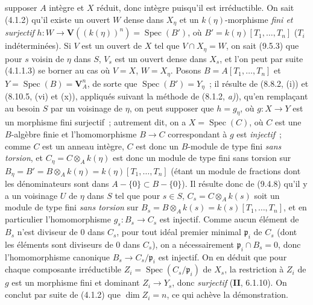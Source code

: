 
supposer $A$ intègre et $X$ réduit, donc intègre puisqu'il est irréductible. On
sait (4.1.2) qu'il existe un ouvert $W$ dense dans $X_\eta$ et un
$k(\eta)$-morphisme \emph{fini et surjectif}
$h:W\to\mathbf V((k(\eta))^n)=\operatorname{Spec}(B')$, où
$B'=k(\eta)[T_1,\ldots,T_n]$ ($T_i$ indéterminées). Si $V$ est un ouvert de
$X$ tel que $V\cap X_\eta=W$, on sait (9.5.3) que pour $s$ voisin de $\eta$
dans $S$, $V_s$ est un ouvert dense dans $X_s$, et l'on peut par suite (4.1.1.3)
se borner au cas où $V=X$, $W=X_\eta$. Posons
$B=A[T_1,\ldots,T_n]$ et $Y=\operatorname{Spec}(B)=\mathbf V_A^n$, de sorte
que $\operatorname{Spec}(B')=Y_\eta$~; il résulte de (8.8.2, (i)) et
(8.10.5, (vi) et (x)), appliqués suivant la méthode de (8.1.2, \emph{a)}),
qu'en remplaçant au besoin $S$ par un voisinage de $\eta$, on peut supposer que
$h=g_\eta$, où $g:X\to Y$ est un morphisme fini surjectif~; autrement dit, on
a $X=\operatorname{Spec}(C)$, où $C$ est une $B$-algèbre finie et
l'homomorphisme $B\to C$ correspondant à $g$ est \emph{injectif}~; comme $C$
est un anneau intègre, $C$ est donc un $B$-module de type fini \emph{sans
torsion}, et $C_\eta=C\otimes_A k(\eta)$ est donc un module de type fini sans
torsion sur $B_\eta=B'=B\otimes_A k(\eta)=k(\eta)[T_1,\ldots,T_n]$ (étant un
module de fractions dont les dénominateurs sont dans
$A-\{0\}\subset B-\{0\}$). Il résulte donc de (9.4.8) qu'il y a un voisinage
$U$ de $\eta$ dans $S$ tel que pour $s\in S$,
$C_s=C\otimes_A k(s)$ soit un module de type fini \emph{sans torsion} sur
$B_s=B\otimes_A k(s)=k(s)[T_1,\ldots,T_n]$, et en particulier l'homomorphisme
$g_s:B_s\to C_s$ est injectif. Comme aucun élément de $B_s$ n'est diviseur de
0 dans $C_s$, pour tout idéal premier minimal $\mathfrak p_i$ de $C_s$ (dont
les éléments sont diviseurs de 0 dans $C_s$), on a nécessairement
$\mathfrak p_i\cap B_s=0$, donc l'homomorphisme canonique
$B_s\to C_s/\mathfrak p_i$ est injectif. On en déduit que pour chaque
composante irréductible $Z_i=\operatorname{Spec}(C_s/\mathfrak p_i)$ de $X_s$,
la restriction à $Z_i$ de $g$ est un morphisme fini et dominant $Z_i\to Y_s$,
donc \emph{surjectif} (\textbf{II}, 6.1.10). On conclut par suite de (4.1.2)
que $\dim Z_i=n$, ce qui achève la démonstration.

